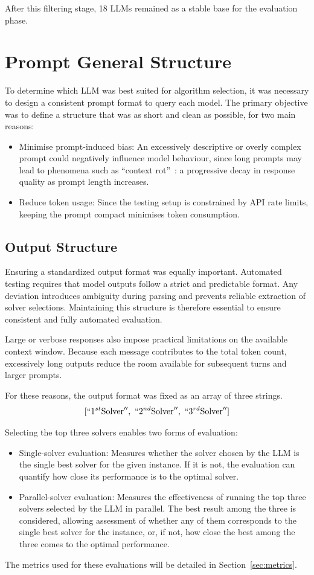\documentclass[../../main]{subfiles}
\begin{document}
After this filtering stage, 18 LLMs remained as a stable base for the
evaluation phase.

\section{Prompt General Structure}
\label{sec:promptStruct}
To determine which LLM was best suited for algorithm selection, it was necessary to design a consistent prompt format to query each model.
The primary objective was to define a structure that was as short and clean as possible, for two main reasons:
\begin{itemize}
    \item Minimise prompt-induced bias: An excessively descriptive or overly complex prompt could negatively influence model behaviour, since long prompts may lead to phenomena such as ``context rot''~\cite{ContextRot}: a progressive decay in response quality as prompt length increases.
    \item Reduce token usage: Since the testing setup is constrained by API rate limits, keeping the prompt compact minimises token consumption.
\end{itemize}

\subsection{Output Structure}
Ensuring a standardized output format was equally important.
Automated testing requires that model outputs follow a strict and predictable format. Any deviation introduces ambiguity during parsing and prevents reliable extraction of solver selections. Maintaining this structure is therefore essential to ensure consistent and fully automated evaluation.

Large or verbose responses also impose practical limitations on the available context window. Because each message contributes to the total token count, excessively long outputs reduce the room available for subsequent turns and larger prompts.

For these reasons, the output format was fixed as an array of three strings.
\[
[``1^{st}\text{Solver}'',\ ``2^{nd}\text{Solver}'',\ ``3^{rd}\text{Solver}'']
\]

Selecting the top three solvers enables two forms of evaluation:
\begin{itemize}
    \item Single-solver evaluation: Measures whether the solver chosen by the LLM is the single best solver for the given instance. If it is not, the evaluation can quantify how close its performance is to the optimal solver.
    \item Parallel-solver evaluation: Measures the effectiveness of running the top three solvers selected by the LLM in parallel. The best result among the three is considered, allowing assessment of whether any of them corresponds to the single best solver for the instance, or, if not, how close the best among the three comes to the optimal performance.
\end{itemize}
The metrics used for these evaluations will be detailed in Section~\ref{sec:metrics}.
\end{document}
